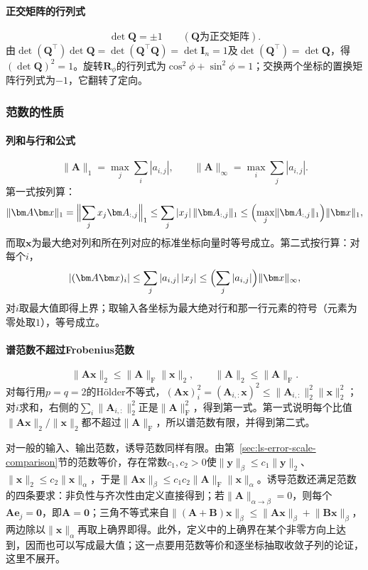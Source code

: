 \paragraph{正交矩阵的行列式}
\[
 \det\bm Q=\pm1\qquad(\bm Q\text{为正交矩阵}).
\]
由$\det(\bm Q^\top)\det\bm Q=\det(\bm Q^\top\bm Q)=\det\bm I_n=1$及$\det(\bm Q^\top)=\det\bm Q$，得$(\det\bm Q)^2=1$。旋转$\bm R_\phi$的行列式为$\cos^2\phi+\sin^2\phi=1$；交换两个坐标的置换矩阵行列式为$-1$，它翻转了定向。

\subsubsection{范数的性质}

\paragraph{列和与行和公式}
\[
 \lVert\bm A\rVert_1=\max_j\sum_i|a_{i,j}|,\qquad
 \lVert\bm A\rVert_\infty=\max_i\sum_j|a_{i,j}|.
\]
第一式按列算：
\[
 \lVert\bm A\bm x\rVert_1=\Bigl\lVert\sum_jx_j\bm A_{:,j}\Bigr\rVert_1\leq\sum_j|x_j|\,\lVert\bm A_{:,j}\rVert_1\leq\Bigl(\max_j\lVert\bm A_{:,j}\rVert_1\Bigr)\lVert\bm x\rVert_1,
\]
而取$\bm x$为最大绝对列和所在列对应的标准坐标向量时等号成立。第二式按行算：对每个$i$，
\[
 |(\bm A\bm x)_i|\leq\sum_j|a_{i,j}|\,|x_j|\leq\Bigl(\sum_j|a_{i,j}|\Bigr)\lVert\bm x\rVert_\infty,
\]
对$i$取最大值即得上界；取输入各坐标为最大绝对行和那一行元素的符号（元素为零处取$1$），等号成立。

\paragraph{谱范数不超过Frobenius范数}
\[
 \lVert\bm A\bm x\rVert_2\leq\lVert\bm A\rVert_{\mathrm F}\lVert\bm x\rVert_2,\qquad
 \lVert\bm A\rVert_2\leq\lVert\bm A\rVert_{\mathrm F}.
\]
对每行用$p=q=2$的Hölder不等式，$(\bm A\bm x)_i^2=(\bm A_{i,:}\bm x)^2\leq\lVert\bm A_{i,:}\rVert_2^2\lVert\bm x\rVert_2^2$；对$i$求和，右侧的$\sum_i\lVert\bm A_{i,:}\rVert_2^2$正是$\lVert\bm A\rVert_{\mathrm F}^2$，得到第一式。第一式说明每个比值$\lVert\bm A\bm x\rVert_2/\lVert\bm x\rVert_2$都不超过$\lVert\bm A\rVert_{\mathrm F}$，所以谱范数有限，并得到第二式。

对一般的输入、输出范数，诱导范数同样有限。由第~\ref{sec:ls-error-scale-comparison}节的范数等价，存在常数$c_1,c_2>0$使$\lVert\bm y\rVert_\beta\leq c_1\lVert\bm y\rVert_2$、$\lVert\bm x\rVert_2\leq c_2\lVert\bm x\rVert_\alpha$，于是$\lVert\bm A\bm x\rVert_\beta\leq c_1c_2\lVert\bm A\rVert_{\mathrm F}\lVert\bm x\rVert_\alpha$。诱导范数还满足范数的四条要求：非负性与齐次性由定义直接得到；若$\lVert\bm A\rVert_{\alpha\to\beta}=0$，则每个$\bm A\bm e_j=\bm0$，即$\bm A=\bm0$；三角不等式来自$\lVert(\bm A+\bm B)\bm x\rVert_\beta\leq\lVert\bm A\bm x\rVert_\beta+\lVert\bm B\bm x\rVert_\beta$，两边除以$\lVert\bm x\rVert_\alpha$再取上确界即得。此外，定义中的上确界在某个非零方向上达到，因而也可以写成最大值；这一点要用范数等价和逐坐标抽取收敛子列的论证，这里不展开。

